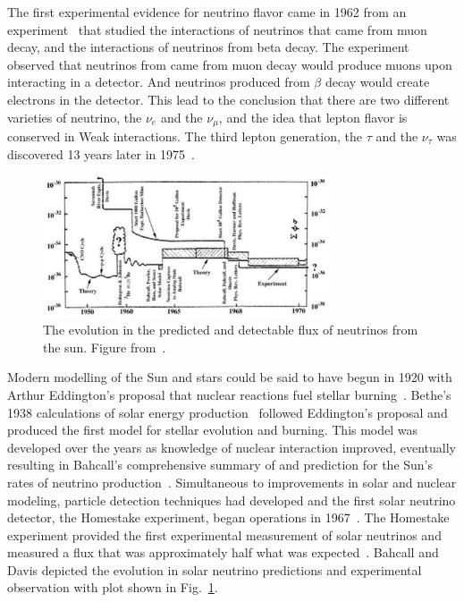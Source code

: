 The first experimental evidence for neutrino flavor came in 1962 from an
experiment~\citep{lederman_muon_flavor} that studied the interactions of
neutrinos that came from muon decay, and the interactions of neutrinos
from beta decay.
The experiment observed that neutrinos from came from muon decay would produce
muons upon interacting in a detector.
And neutrinos produced from $\beta$ decay would create electrons in the
detector.
This lead to the conclusion that there are two different varieties of neutrino,
the $\nu_e$ and the $\nu_{\mu}$, and the idea that lepton flavor is conserved in
Weak interactions.
The third lepton generation, the $\tau$ and the $\nu_{\tau}$ was discovered 13
years later in 1975~\citep{tau_discovery}.

\begin{figure}[htbp]
\centering
\includegraphics[width=0.75\textwidth]{bahcall_evolution}
\caption[Evolution of Solar Neutrino Predictions and Observations]{
The evolution in the predicted and detectable flux of neutrinos from the sun.
Figure from~\cite{bahcall_evolution}.}
\label{fig:solar_evolution_cartoon}
\end{figure}

Modern modelling of the Sun and stars could be said to have begun in 1920 with
Arthur Eddington's proposal that nuclear reactions fuel stellar burning~\cite{eddington}.
Bethe's 1938 calculations of solar energy production~\cite{bethe1, bethe2}
followed Eddington's proposal and produced the first model for stellar evolution and burning.
This model was developed over the years as knowledge of nuclear interaction
improved, eventually resulting in Bahcall's comprehensive summary of and
prediction for the Sun's rates of neutrino
production~\cite{bahcall_solar_neutrinos_theory}.
Simultaneous to improvements in solar and nuclear modeling,
particle detection techniques had developed and
the first solar neutrino detector, the Homestake experiment, began
operations in 1967~\cite{homestake_initial}.
The Homestake experiment provided the first experimental measurement
of solar neutrinos and measured a flux that was approximately half what was expected~\cite{homestake}.
Bahcall and Davis depicted the evolution in solar neutrino predictions and
experimental observation with plot shown in Fig.~\ref{fig:solar_evolution_cartoon}.

